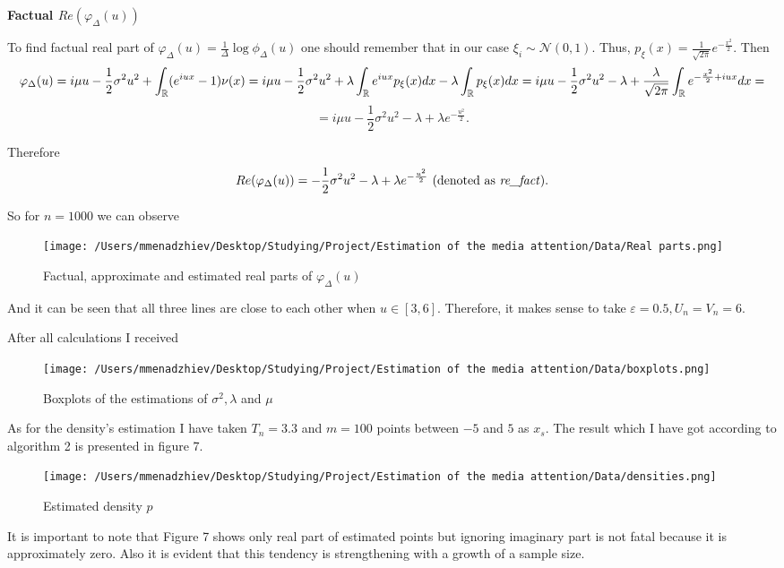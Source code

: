 \textbf{Factual $Re(\varphi_{\Delta}(u))$}

To find factual real part of $\varphi_{\Delta}(u) = \frac 1 \Delta \log \phi_{\Delta}(u)$ one should remember that in our case $\xi_i \sim \mathcal{N}(0, 1)$. Thus, $p_{\xi}(x) = \frac {1} {\sqrt{2 \pi}} e^{- \frac {x^2} {2}}$. Then \[ \varphi_{\Delta}(u) = i \mu u - \frac 12 \sigma^2 u^2 + \int_{\mathbb R} (e^{iux} - 1) \nu(x) =  i \mu u - \frac 12 \sigma^2 u^2 + \lambda \int_{\mathbb R} e^{iux} p_{\xi}(x) dx - \lambda \int_{\mathbb R} p_{\xi}(x) dx =  i \mu u - \frac 12 \sigma^2 u^2 - \lambda + \frac{\lambda}{\sqrt{2 \pi}} \int_{\mathbb R} e^{-\frac{x^2}{2} + iux} dx = \] \[ = i \mu u - \frac 12 \sigma^2 u^2 - \lambda + \lambda e^{-\frac{u^2}{2}}. \]

Therefore \[ Re(\varphi_{\Delta}(u)) = - \frac 12 \sigma^2 u^2 - \lambda + \lambda e^{-\frac{u^2}{2}} \text{ (denoted as \textit{re\_fact}).} \]

So for $n = 1000$ we can observe
\begin{figure}[H]
    \centering
    \texttt{[image: /Users/mmenadzhiev/Desktop/Studying/Project/Estimation of the media attention/Data/Real parts.png]}
    \caption{Factual, approximate and estimated real parts of $\varphi_{\Delta}(u)$}
\end{figure}

And it can be seen that all three lines are close to each other when $u \in [3, 6]$. Therefore, it makes sense to take $\varepsilon = 0.5, U_n  = V_n = 6$.


After all calculations I received
\begin{figure}[H]
    \centering
    \texttt{[image: /Users/mmenadzhiev/Desktop/Studying/Project/Estimation of the media attention/Data/boxplots.png]}
    \caption{Boxplots of the estimations of $\sigma^2, \lambda$ and $\mu$}
\end{figure}

As for the density's estimation I have taken $T_n = 3.3$ and $m = 100$ points between $-5$ and $5$ as $x_s$. The result which I  have got according to algorithm 2 is presented in figure 7.

\begin{figure}[H]
    \centering
    \texttt{[image: /Users/mmenadzhiev/Desktop/Studying/Project/Estimation of the media attention/Data/densities.png]}
    \caption{Estimated density $p$}
\end{figure}

It is important to note that Figure 7 shows only real part of estimated points but ignoring imaginary part is not fatal because it is approximately zero. Also it is evident that this tendency is strengthening with a growth of a sample size.

